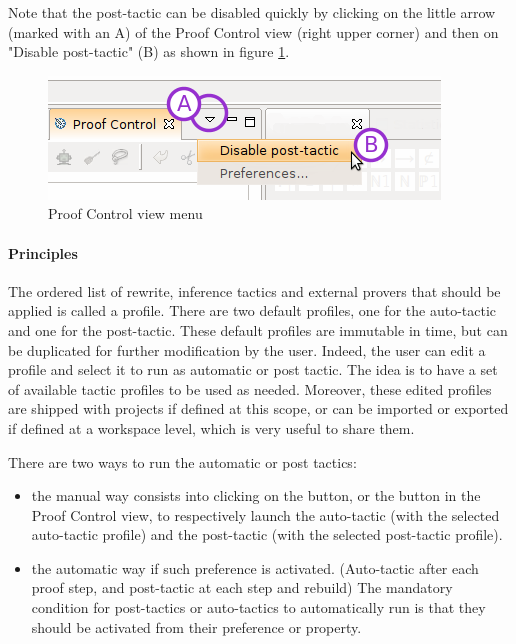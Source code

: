 Note that the post-tactic can be disabled quickly by clicking on the little arrow (marked with an A) of the \textsf{Proof Control view} (right upper corner) and then on "Disable post-tactic" (B) as shown in figure \ref{fig_ref_01_proving_perspective12}.

\begin{figure}[!h]
\begin{center}
	\includegraphics{img/reference/ref_01_proving_perspective12.png}
	\caption{Proof Control view menu}
	\label{fig_ref_01_proving_perspective12}
\end{center}
\end{figure}

\paragraph{Principles}

The ordered list of rewrite, inference tactics and external provers that should be applied is called a profile. There are two default profiles, one for the auto-tactic and one for the post-tactic. These default profiles are immutable in time, but can be duplicated for further modification by the user. Indeed, the user can edit a profile and select it to run as automatic or post tactic. The idea is to have a set of available tactic profiles to be used as needed. Moreover, these edited profiles are shipped with projects if defined at this scope, or can be imported or exported if defined at a workspace level, which is very useful to share them.

There are two ways to run the automatic or post tactics:

\begin{itemize}
	\item the manual way consists into clicking on the  button, or the  button in the \textsf{Proof Control view}, to respectively launch the auto-tactic (with the selected auto-tactic profile) and the post-tactic (with the selected post-tactic profile).
	\item the automatic way if such preference is activated. (Auto-tactic after each proof step, and post-tactic at each step and rebuild) The mandatory condition for post-tactics or auto-tactics to automatically run is that they should be activated from their preference or property. 
\end{itemize}

